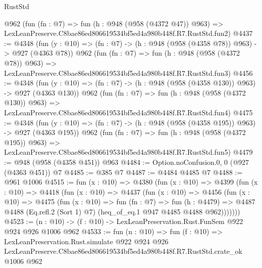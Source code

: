 \begin{lexlean}{RustStd}
\begin{coremodule}
    @962
    (fun (fn : @7) =>
    fun (h : @948 (@958 (@4372 @47)) @963) =>
    LexLeanPreserve.C8bae86ed806619534bf5ed4a980b448f.R7.RustStd.fun2)
@4437 := @4348
    (fun (y : @10) => (fn : @7) -> (h : @948 (@958 (@4358 @78)) @963) -> @927 (@4363 @78))
    @962
    (fun (fn : @7) =>
    fun (h : @948 (@958 (@4372 @78)) @963) =>
    LexLeanPreserve.C8bae86ed806619534bf5ed4a980b448f.R7.RustStd.fun3)
@4456 := @4348
    (fun (y : @10) => (fn : @7) -> (h : @948 (@958 (@4358 @130)) @963) -> @927 (@4363 @130))
    @962
    (fun (fn : @7) =>
    fun (h : @948 (@958 (@4372 @130)) @963) =>
    LexLeanPreserve.C8bae86ed806619534bf5ed4a980b448f.R7.RustStd.fun4)
@4475 := @4348
    (fun (y : @10) => (fn : @7) -> (h : @948 (@958 (@4358 @195)) @963) -> @927 (@4363 @195))
    @962
    (fun (fn : @7) =>
    fun (h : @948 (@958 (@4372 @195)) @963) =>
    LexLeanPreserve.C8bae86ed806619534bf5ed4a980b448f.R7.RustStd.fun5)
@4479 := @948 (@958 (@4358 @451)) @963
@4484 := Option.noConfusion.{0, 0} (@927 (@4363 @451)) @7
@4485 := @385 @7
@4487 := @4484 @4485 @7
@4488 := @961 @1006
@4515 := fun (x : @10) =>
  @4380
    (fun (x : @10) =>
    @4399
      (fun (x : @10) =>
      @4418
        (fun (x : @10) =>
        @4437
          (fun (x : @10) =>
          @4456
            (fun (x : @10) =>
            @4475
              (fun (x : @10) =>
              fun (fn : @7) =>
              fun (h : @4479) =>
              @4487 @4488 (Eq.refl.{2} (Sort 1) @7) (heq_of_eq.{1} @947 @4485 @4488 @962)))))))
@4523 := (n : @10) -> (f : @10) -> LexLeanPreservation.Rust.FunSem @922 @924 @926 @1006 @962
@4533 := fun (n : @10) =>
  fun (f : @10) =>
  LexLeanPreservation.Rust.simulate
    @922
    @924
    @926
    LexLeanPreserve.C8bae86ed806619534bf5ed4a980b448f.R7.RustStd.crate_ok
    @1006
    @962
\end{coremodule}
\end{lexlean}
